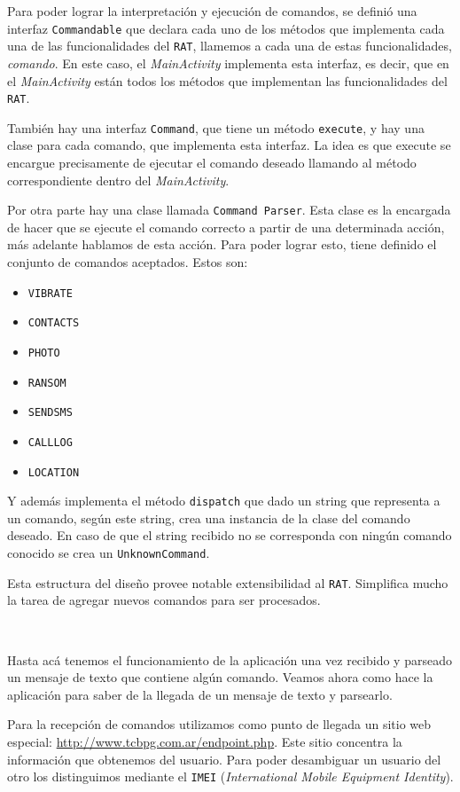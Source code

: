 Para poder lograr la interpretación y ejecución de comandos, se definió una interfaz {\tt Commandable} que declara cada uno de los métodos que implementa cada una de las funcionalidades del \texttt{RAT}, llamemos a cada una de estas funcionalidades, \emph{comando}. En este caso, el \emph{MainActivity} implementa esta interfaz, es decir, que en el \emph{MainActivity} están todos los métodos que implementan las funcionalidades del \texttt{RAT}.

También hay una interfaz {\tt Command}, que tiene un método {\tt execute}, y hay una clase para cada comando, que implementa esta interfaz.
La idea es que execute se encargue precisamente de ejecutar el comando deseado llamando al método correspondiente dentro del \emph{MainActivity}.

Por otra parte hay una clase llamada {\tt Command Parser}. Esta clase es la encargada de hacer que se ejecute el comando correcto a partir de una determinada acción, más adelante hablamos de esta acción. Para poder lograr esto, tiene definido el conjunto de comandos aceptados. Estos son:

\begin{itemize}
\item {\tt VIBRATE}
\item {\tt CONTACTS}
\item {\tt PHOTO}
\item {\tt RANSOM}
\item {\tt SENDSMS}
\item {\tt CALLLOG}
\item {\tt LOCATION}
\end{itemize}

Y además implementa el método {\tt dispatch} que dado un string que representa a un comando, según este string, crea una instancia de la clase del comando deseado. En caso de que el string recibido no se corresponda con ningún comando conocido se crea un {\tt UnknownCommand}.

Esta estructura del diseño provee notable extensibilidad al \texttt{RAT}. Simplifica mucho la tarea de agregar nuevos comandos para ser procesados.

~\newline

Hasta acá tenemos el funcionamiento de la aplicación una vez recibido y parseado un mensaje de texto que contiene algún comando.
Veamos ahora como hace la aplicación para saber de la llegada de un mensaje de texto y parsearlo.

Para la recepción de comandos utilizamos como punto de llegada un sitio web especial: \url{http://www.tcbpg.com.ar/endpoint.php}. Este sitio concentra la información que obtenemos del usuario. Para poder desambiguar un usuario del otro los distinguimos mediante el \texttt{IMEI} (\textit{International Mobile Equipment Identity}).

